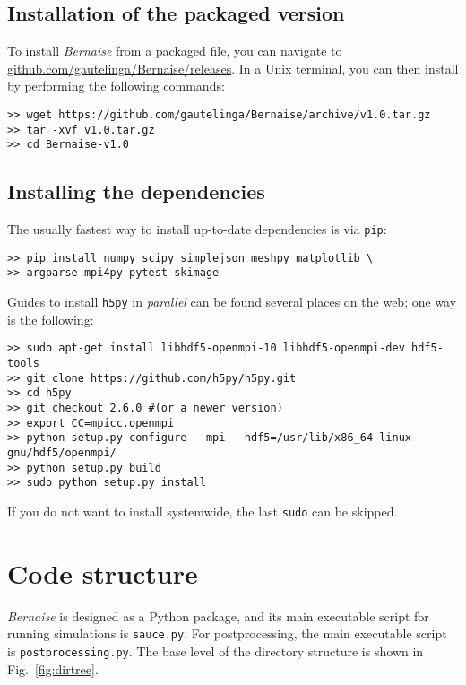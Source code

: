 \documentclass[a4paper,10pt]{article}
\begin{document}
\subsection{Installation of the packaged version}
To install \emph{Bernaise} from a packaged file, you can navigate to \url{github.com/gautelinga/Bernaise/releases}.
In a Unix terminal, you can then install by performing the following commands:
\begin{verbatim}
>> wget https://github.com/gautelinga/Bernaise/archive/v1.0.tar.gz
>> tar -xvf v1.0.tar.gz
>> cd Bernaise-v1.0
\end{verbatim}

\subsection{Installing the dependencies}
The usually fastest way to install up-to-date dependencies is via \texttt{pip}:
\begin{verbatim}
>> pip install numpy scipy simplejson meshpy matplotlib \
>> argparse mpi4py pytest skimage
\end{verbatim}
Guides to install \texttt{h5py} in \emph{parallel} can be found several places on the web; one way is the following:
\begin{verbatim}
>> sudo apt-get install libhdf5-openmpi-10 libhdf5-openmpi-dev hdf5-tools
>> git clone https://github.com/h5py/h5py.git
>> cd h5py
>> git checkout 2.6.0 #(or a newer version)
>> export CC=mpicc.openmpi
>> python setup.py configure --mpi --hdf5=/usr/lib/x86_64-linux-gnu/hdf5/openmpi/
>> python setup.py build
>> sudo python setup.py install
\end{verbatim}
If you do not want to install systemwide, the last \texttt{sudo} can be skipped.

\section{Code structure}
\emph{Bernaise} is designed as a Python package, and its main executable script for running simulations is \texttt{sauce.py}.
For postprocessing, the main executable script is \texttt{postprocessing.py}.
The base level of the directory structure is shown in Fig.\ \ref{fig:dirtree}.
\end{document}
